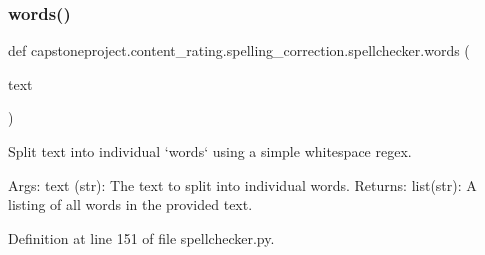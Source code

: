 \subsubsection{\texorpdfstring{words()}{words()}}
{\footnotesize\ttfamily def capstoneproject.\+content\+\_\+rating.\+spelling\+\_\+correction.\+spellchecker.\+words (\begin{DoxyParamCaption}\item[{}]{text }\end{DoxyParamCaption})}

\begin{DoxyVerb}Split text into individual `words` using a simple whitespace regex.

    Args:
        text (str): The text to split into individual words.
    Returns:
        list(str): A listing of all words in the provided text.
\end{DoxyVerb}
 

Definition at line 151 of file spellchecker.\+py.

